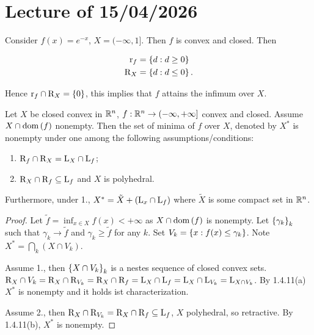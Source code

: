 \chapter{Lecture \thechapter{} of 15/04/2026}

\begin{example}
    
    Consider $f(x) = e^{-x}$, $X = (-\infty,1]$. Then $f$ is convex and closed. Then 

    \begin{align*}
        \mathrm{r}_{f} &= \left\{ d : d \ge 0 \right\} \\
        \mathrm{R}_{X} &= \left\{ d : d \le 0 \right\}.
    \end{align*}

    Hence $\mathrm{r}_{f} \cap \mathrm{R}_{X} = \left\{ 0 \right\}$, this implies that $f$ attains the infimum over $X$.

\end{example}

\begin{proposition}[Book 3.2.4]

    Let $X$ be closed convex in ${\mathbb{R}^n}$, $f : {\mathbb{R}^n} \to (-\infty,+\infty]$ convex and closed. Assume $X \cap \mathrm{dom}\left(f\right)$ nonempty. Then the set of minima of $f$ over $X$, denoted by $X^*$ is nonempty under one among the following assumptions/conditions: 
    
    \begin{enumerate}
        \item $\mathrm{R}_{f} \cap \mathrm{R}_{X} = \mathrm{L}_{X} \cap \mathrm{L}_{f}$;
        \item $\mathrm{R}_{X} \cap \mathrm{R}_{f} \subseteq \mathrm{L}_{f}$ and $X$ is polyhedral. 
    \end{enumerate}

    Furthermore, under 1., $X^* = \tilde{X} + (\mathrm{L}_{x} \cap \mathrm{L}_{f})$ where $\tilde{X}$ is some compact set in ${\mathbb{R}^n}$. 
    
\end{proposition}

\begin{proof}
    
    Let $\tilde{f} = \inf_{x \in X} f(x) < +\infty$ as $X \cap \mathrm{dom}\left(f\right)$ is nonempty. Let $\left\{ \gamma_k \right\}_k$ such that $\gamma_k \to \tilde{f}$ and $\gamma_k \ge \tilde{f}$ for any $k$. Set $V_k = \left\{ x : f(x) \le \gamma_k \right\}$. Note $X^* = \bigcap_k (X \cap V_k)$. 

    Assume 1., then $\left\{ X \cap V_k \right\}_k$ is a nestes sequence of closed convex sets. $\mathrm{R}_{X} \cap V_k = \mathrm{R}_{X} \cap \mathrm{R}_{V_k} = \mathrm{R}_{X} \cap \mathrm{R}_{f} = \mathrm{L}_{X} \cap \mathrm{L}_{f} = \mathrm{L}_{X} \cap \mathrm{L}_{V_k} = \mathrm{L}_{X \cap V_k}$. By 1.4.11(a) $X^*$ is nonempty and it holds ist characterization.

    Assume 2., then $\mathrm{R}_{X} \cap \mathrm{R}_{V_k} = \mathrm{R}_{X} \cap \mathrm{R}_{f} \subseteq \mathrm{L}_{f}$, $X$ polyhedral, so retractive. By 1.4.11(b), $X^*$ is nonempty.

\end{proof}